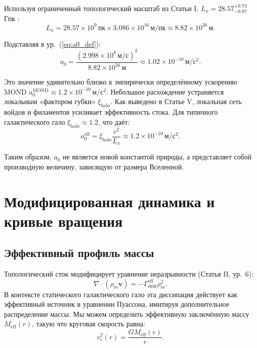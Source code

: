 \documentclass[12pt,a4paper]{article}
\begin{document}
Используя ограниченный топологический масштаб из Статьи I, $L_x = 28.57^{+0.73}_{-0.87}$\,Гпк \citep{Logvinovich2026a}:
\begin{equation}
L_x = 28.57 \times 10^9\,\mathrm{пк} \times 3.086 \times 10^{16}\,\mathrm{м/пк} \approx 8.82 \times 10^{26}\,\mathrm{м}.
\end{equation}

Подставляя в ур.~(\ref{eq:a0_def}):
\begin{equation}
a_0 = \frac{(2.998 \times 10^8\,\mathrm{м/с})^2}{8.82 \times 10^{26}\,\mathrm{м}} \approx 1.02 \times 10^{-10}\,\mathrm{м/с^2}.
\end{equation}

Это значение удивительно близко к эмпирически определённому ускорению MOND $a_0^{\mathrm{MOND}} \approx 1.2 \times 10^{-10}$\,м/с$^2$. Небольшое расхождение устраняется локальным «фактором губки» $\xi_{\mathrm{halo}}$. Как выведено в Статье V, локальная сеть войдов и филаментов усиливает эффективность стока. Для типичного галактического гало $\xi_{\mathrm{halo}} \approx 1.2$, что даёт:
\begin{equation}
a_0^{\mathrm{eff}} = \xi_{\mathrm{halo}} \frac{c^2}{L_x} \approx 1.2 \times 10^{-10}\,\mathrm{м/с^2}.
\end{equation}

Таким образом, $a_0$ не является новой константой природы, а представляет собой производную величину, зависящую от размера Вселенной.

\section{Модифицированная динамика и кривые вращения}

\subsection{Эффективный профиль массы}

Топологический сток модифицирует уравнение неразрывности (Статья II, ур.~6):
\begin{equation}
\nabla \cdot (\rho_m \mathbf{v}) = -\Gamma_{\mathrm{sink}}^{\mathrm{eff}} \rho_m^2.
\end{equation}
В контексте статического галактического гало эта диссипация действует как эффективный источник в уравнении Пуассона, имитируя дополнительное распределение массы. Мы можем определить эффективную заключённую массу $M_{\mathrm{eff}}(r)$, такую что круговая скорость равна:
\begin{equation}
v_c^2(r) = \frac{G M_{\mathrm{eff}}(r)}{r}.
\end{equation}
\end{document}
